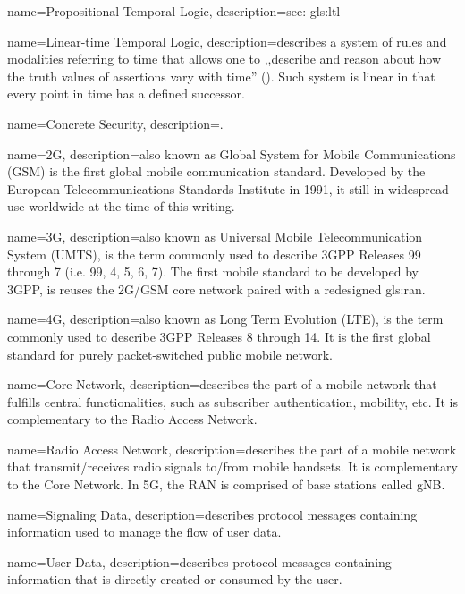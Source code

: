 {
    name={Propositional Temporal Logic},
    description={see: \gls{gls:ltl}}
}

{
    name={Linear-time Temporal Logic},
    description={describes a system of rules and modalities referring to time that allows one to ,,describe and reason about how the truth values of assertions vary
with time'' (\cite{emerson1990temporal}). Such system is linear in that every point in time has a defined successor.}
}

{
    name={Concrete Security},
    description={.}
}

{
    name={2G},
    description={also known as Global System for Mobile Communications (GSM) is the first global mobile communication standard. Developed by the European Telecommunications Standards Institute in 1991, it still in widespread use worldwide at the time of this writing.}
}

{
    name={3G},
    description={also known as Universal Mobile Telecommunication System (UMTS), is the term commonly used to describe 3GPP Releases 99 through 7 (i.e. 99, 4, 5, 6, 7). The first mobile standard to be developed by 3GPP, is reuses the 2G/GSM core network paired with a redesigned \gls{gls:ran}.}
}

{
    name={4G},
    description={also known as Long Term Evolution (LTE), is the term commonly used to describe 3GPP Releases 8 through 14. It is the first global standard for purely packet-switched public mobile network.}
}

{
    name={Core Network},
    description={describes the part of a mobile network that fulfills central functionalities, such as subscriber authentication, mobility, etc. It is complementary to the Radio Access Network.}
}

{
    name={Radio Access Network},
    description={describes the part of a mobile network that transmit/receives radio signals to/from mobile handsets. It is complementary to the Core Network. In 5G, the RAN is comprised of base stations called gNB.}
}

{
    name={Signaling Data},
    description={describes protocol messages containing information used to manage the flow of user data.}
}

{
    name={User Data},
    description={describes protocol messages containing information that is directly created or consumed by the user.}
}